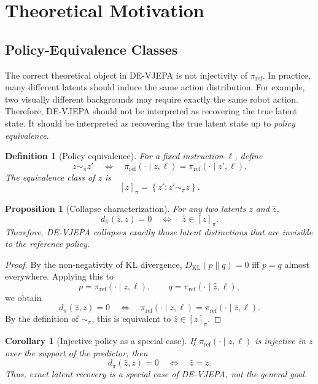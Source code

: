 \documentclass[10pt,twocolumn]{article}
\theoremstyle{tightstyle}
\newtheorem{proposition}{Proposition}
\newtheorem{definition}{Definition}
\newtheorem{corollary}{Corollary}
\begin{document}
\section{Theoretical Motivation}
\label{sec:theory}

\subsection{Policy-Equivalence Classes}

The correct theoretical object in DE-VJEPA is not injectivity of
$\pi_{\mathrm{ref}}$.
In practice, many different latents should induce the same action distribution.
For example, two visually different backgrounds may require exactly the same robot
action.
Therefore, DE-VJEPA should not be interpreted as recovering the true latent state.
It should be interpreted as recovering the true latent state up to
\emph{policy equivalence}.

\begin{definition}[Policy equivalence]
For a fixed instruction $\ell$, define
\[
  z \sim_\pi z'
  \quad \Longleftrightarrow \quad
  \pi_{\mathrm{ref}}(\cdot \mid z,\ell)
  =
  \pi_{\mathrm{ref}}(\cdot \mid z',\ell).
\]
The equivalence class of $z$ is
\[
  [z]_\pi
  =
  \left\{
  z' :
  z' \sim_\pi z
  \right\}.
\]
\end{definition}

\begin{proposition}[Collapse characterization]
\label{prop:collapse}
For any two latents $z$ and $\hat z$,
\[
  d_\pi(\hat z,z) = 0
  \quad \Longleftrightarrow \quad
  \hat z \in [z]_\pi .
\]
Therefore, DE-VJEPA collapses exactly those latent distinctions that are invisible
to the reference policy.
\end{proposition}

\begin{proof}
By the non-negativity of KL divergence,
  $D_{\mathrm{KL}}(p \| q) = 0$
iff $p=q$ almost everywhere.
Applying this to
\[
  p = \pi_{\mathrm{ref}}(\cdot \mid z,\ell),
  \qquad
  q = \pi_{\mathrm{ref}}(\cdot \mid \hat z,\ell),
\]
we obtain
\[
  d_\pi(\hat z,z)=0
  \quad \Longleftrightarrow \quad
  \pi_{\mathrm{ref}}(\cdot \mid z,\ell)
  =
  \pi_{\mathrm{ref}}(\cdot \mid \hat z,\ell).
\]
By the definition of $\sim_\pi$, this is equivalent to
$\hat z \in [z]_\pi$.
\end{proof}

\begin{corollary}[Injective policy as a special case]
If $\pi_{\mathrm{ref}}(\cdot \mid z,\ell)$ is injective in $z$ over the support of
the predictor, then
\[
  d_\pi(\hat z,z)=0
  \quad \Longleftrightarrow \quad
  \hat z=z .
\]
Thus, exact latent recovery is a special case of DE-VJEPA, not the general goal.
\end{corollary}
\end{document}
